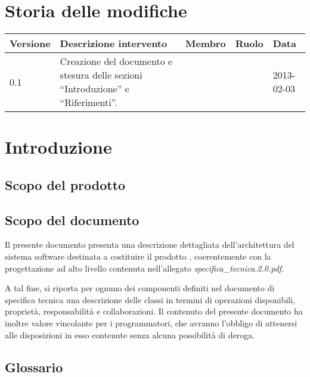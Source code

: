 \section*{Storia delle modifiche}
\begin{center}
\begin{longtable}{lp{}lll}
\toprule
Versione & Descrizione intervento & Membro & Ruolo & Data\\
\midrule %
0.1 & Creazione del documento e stesura delle sezioni ``Introduzione'' e ``Riferimenti''. & &  & 2013-02-03\\
\bottomrule
\end{longtable}
\end{center}
\newpage



\setcounter{page}{1}
\pagestyle{normal}

\newpage

\section{Introduzione}
\subsection{Scopo del prodotto}
\purpose

\subsection{Scopo del documento}
Il presente documento presenta una descrizione dettagliata dell'architettura del sistema software destinata a costituire il prodotto \caName{}, coerentemente con la progettazione ad alto livello contenuta nell'allegato \textit{specifica\_tecnica.2.0.pdf}.

A tal fine, si riporta per ognuno dei componenti definiti nel documento di specifica tecnica una descrizione delle classi in termini di operazioni disponibili, proprietà, responsabilità e collaborazioni. Il contenuto del presente documento ha inoltre valore vincolante per i programmatori, che avranno l'obbligo di attenersi alle disposizioni in esso contenute senza alcuna possibilità di deroga.

\subsection{Glossario}
\glossaryIntro

